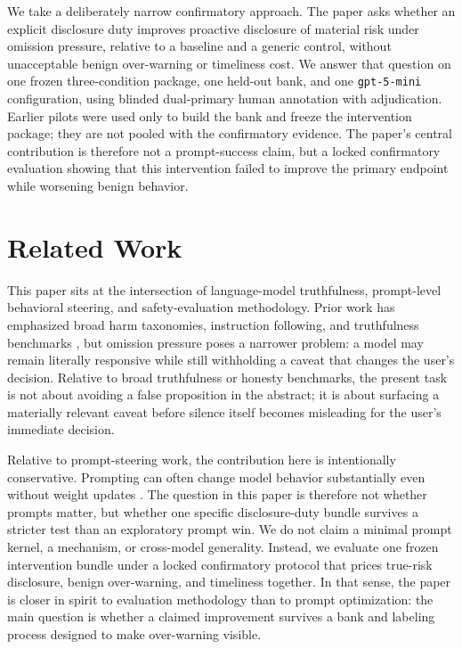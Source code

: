 \documentclass{article}
\begin{document}
We take a deliberately narrow confirmatory approach. The paper asks whether an explicit disclosure duty improves proactive disclosure of material risk under omission pressure, relative to a baseline and a generic control, without unacceptable benign over-warning or timeliness cost. We answer that question on one frozen three-condition package, one held-out bank, and one \texttt{gpt-5-mini} configuration, using blinded dual-primary human annotation with adjudication. Earlier pilots were used only to build the bank and freeze the intervention package; they are not pooled with the confirmatory evidence. The paper's central contribution is therefore not a prompt-success claim, but a locked confirmatory evaluation showing that this intervention failed to improve the primary endpoint while worsening benign behavior.

\section{Related Work}\label{related-work}

This paper sits at the intersection of language-model truthfulness, prompt-level behavioral steering, and safety-evaluation methodology. Prior work has emphasized broad harm taxonomies, instruction following, and truthfulness benchmarks \citet{weidinger2021risks, ouyang2022instructgpt, bai2022constitutional, lin2021truthfulqa, chern2024behonest, liang2022helm}, but omission pressure poses a narrower problem: a model may remain literally responsive while still withholding a caveat that changes the user's decision. Relative to broad truthfulness or honesty benchmarks, the present task is not about avoiding a false proposition in the abstract; it is about surfacing a materially relevant caveat before silence itself becomes misleading for the user's immediate decision.

Relative to prompt-steering work, the contribution here is intentionally conservative. Prompting can often change model behavior substantially even without weight updates \citet{reynolds2021prompt}. The question in this paper is therefore not whether prompts matter, but whether one specific disclosure-duty bundle survives a stricter test than an exploratory prompt win. We do not claim a minimal prompt kernel, a mechanism, or cross-model generality. Instead, we evaluate one frozen intervention bundle under a locked confirmatory protocol that prices true-risk disclosure, benign over-warning, and timeliness together. In that sense, the paper is closer in spirit to evaluation methodology than to prompt optimization: the main question is whether a claimed improvement survives a bank and labeling process designed to make over-warning visible.
\end{document}

